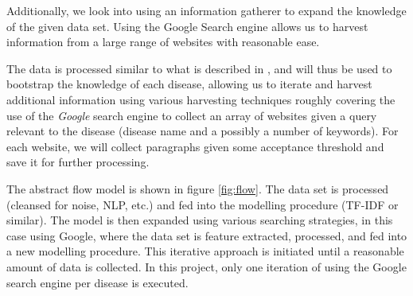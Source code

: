 \documentclass[10pt,letterpaper,final]{article}
\begin{document}
Additionally, we look into using an information gatherer to expand the
knowledge of the given data set. Using the Google Search engine allows
us to harvest information from a large range of websites with reasonable
ease.




The data is processed similar to what is described in
\cite{jensenandersen}, and will thus be used to bootstrap the knowledge
of each disease, allowing us to iterate and harvest additional
information using various harvesting techniques roughly covering the use
of the \textit{Google} search engine to collect an array of websites
given a query relevant to the disease (disease name and a possibly a
number of keywords). For each website, we will collect paragraphs given some acceptance threshold and
save it for further processing.


The abstract flow model is shown in figure \ref{fig:flow}. The data set
is processed (cleansed for noise, NLP, etc.) and fed into the modelling
procedure (TF-IDF or similar). The model is then expanded using various
searching strategies, in this case using Google, where the data set is
feature extracted, processed, and fed into a new modelling procedure.
This iterative approach is initiated until a reasonable amount of data
is collected. In this project, only one iteration of using the Google
search engine per disease is executed.
\end{document}
